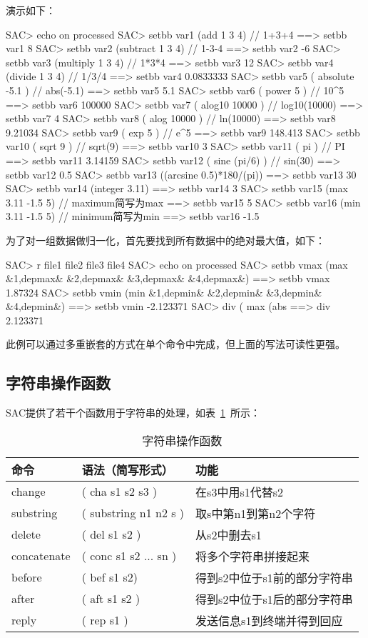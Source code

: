 演示如下：
\begin{SACCode}
SAC> echo on processed
SAC> setbb var1 (add 1 3 4)         // 1+3+4
 ==>  setbb var1 8
SAC> setbb var2 (subtract 1 3 4)    // 1-3-4
 ==>  setbb var2 -6
SAC> setbb var3 (multiply 1 3 4)    // 1*3*4
 ==>  setbb var3 12
SAC> setbb var4 (divide 1 3 4)      // 1/3/4
 ==>  setbb var4 0.0833333
SAC> setbb var5 ( absolute -5.1 )   // abs(-5.1)
 ==>  setbb var5 5.1
SAC> setbb var6 ( power 5 )         // 10^5
 ==>  setbb var6 100000
SAC> setbb var7 ( alog10 10000 )    // log10(10000)
 ==>  setbb var7 4
SAC> setbb var8 ( alog 10000 )      // ln(10000)
 ==>  setbb var8 9.21034
SAC> setbb var9 ( exp 5 )           // e^5
 ==>  setbb var9 148.413
SAC> setbb var10 ( sqrt 9 )         // sqrt(9)
 ==>  setbb var10 3
SAC> setbb var11 ( pi )             // PI
 ==>  setbb var11 3.14159
 SAC> setbb var12 ( sine (pi/6) )   // sin(30)
 ==>  setbb var12 0.5
SAC> setbb var13 ((arcsine 0.5)*180/(pi))
 ==>  setbb var13 30
SAC> setbb var14 (integer 3.11)
 ==>  setbb var14 3
SAC> setbb var15 (max 3.11 -1.5 5)  // maximum简写为max
 ==>  setbb var15 5
SAC> setbb var16 (min 3.11 -1.5 5)  // minimum简写为min
 ==>  setbb var16 -1.5
\end{SACCode}

为了对一组数据做归一化，首先要找到所有数据中的绝对最大值，如下：
\begin{SACCode}
SAC> r file1 file2 file3 file4
SAC> echo on processed
SAC> setbb vmax (max &1,depmax& &2,depmax& &3,depmax& &4,depmax&)
 ==> setbb vmax 1.87324
SAC> setbb vmin (min &1,depmin& &2,depmin& &3,depmin& &4,depmin&)
 ==> setbb vmin -2.123371
SAC> div ( max (abs %
 ==>  div 2.123371 
\end{SACCode}
此例可以通过多重嵌套的方式在单个命令中完成，但上面的写法可读性更强。

\subsection{字符串操作函数}
SAC提供了若干个函数用于字符串的处理，如表~\ref{table:string-operation-functions}~所示：

\begin{table}[!ht]
\centering
\ttfamily
\small
\caption{字符串操作函数}
\label{table:string-operation-functions}
\begin{tabular}{lll}
	\toprule
	命令	&	语法（简写形式）	&	功能	\\
	\midrule
	change		&	( cha s1 s2 s3 ) 	&	在s3中用s1代替s2	\\
	substring 	&	( substring n1 n2 s ) 	&	取s中第n1到第n2个字符\\
	delete		&	( del s1 s2 )		&	从s2中删去s1	\\
	concatenate &	( conc s1 s2 ... sn )	&	将多个字符串拼接起来 \\
	before		&	( bef s1 s2)			&	得到s2中位于s1前的部分字符串\\
	after		&	( aft s1 s2 )			&	得到s2中位于s1后的部分字符串\\
	reply		&	( rep s1 )			&	发送信息s1到终端并得到回应	\\
	\bottomrule
\end{tabular}
\end{table}

